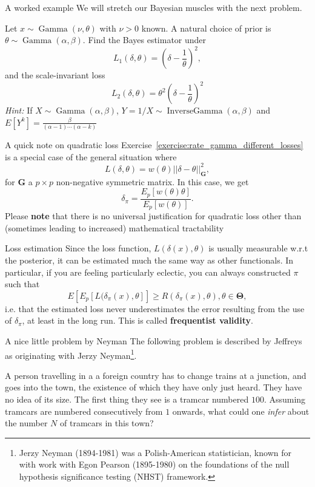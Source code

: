 \begin{frame}{A worked example}
We will stretch our Bayesian muscles with the next problem. 
\begin{exercise}
\label{exercise:rate_gamma_different_losses}
 Let $x \sim \operatorname{Gamma}(\nu, \theta)$ with $\nu >0$ known.
 A natural choice of prior is $\theta \sim \operatorname{Gamma}(\alpha, \beta)$.
 Find the Bayes estimator under 
 $$ L_1(\delta, \theta) = \left(\delta - \frac{1}{\theta}\right)^2, $$
 and the scale-invariant loss
 $$ L_2(\delta, \theta) = \theta^2 \left(\delta - \frac{1}{\theta}\right)^2$$
 \textit{Hint:} If $X \sim \operatorname{Gamma}(\alpha, \beta)$, $Y = 1/X \sim \operatorname{InverseGamma}(\alpha, \beta)$ and $E[Y^k] = \frac{\beta}{(\alpha-1)\cdots(\alpha-k)}$
\end{exercise}
\end{frame}
\begin{frame}{A quick note on quadratic loss}
 Exercise~\ref{exercise:rate_gamma_different_losses} is a special case of the general situation where 
 $$ L(\delta, \theta) = w(\theta) ||\delta-\theta||_{\boldsymbol{G}}^2, $$
 for $\boldsymbol{G}$ a $p \times p$ non-negative symmetric matrix.
 In this case, we get
 $$ \delta_\pi = \frac{E_p[w(\theta)\theta]}{E_p[w(\theta)]}. $$
 Please \textbf{note} that there is no universal justification for quadratic loss other than (sometimes leading to increased) mathematical tractability
\end{frame}
\begin{frame}{Loss estimation}
 Since the loss function, $L(\delta(x), \theta)$ is usually measurable w.r.t the posterior, it can be estimated much the same way as other functionals.
 In particular, if you are feeling particularly eclectic, you can always constructed $\pi$ such that
 $$ E\left[E_p[L(\delta_\pi(x), \theta]\right] \geq R(\delta_\pi(x), \theta),  \theta \in \boldsymbol{\Theta}, $$
 i.e. that the estimated loss never underestimates the error resulting from the use of $\delta_\pi$, at least in the long run.
 This is called \textbf{frequentist validity}.
 \end{frame}
\begin{frame}{A nice little problem by Neyman}
The following problem is described by Jeffreys as originating with Jerzy Neyman\footnote{Jerzy Neyman (1894-1981) was a Polish-American statistician, known for with work with Egon Pearson (1895-1980) on the foundations of the null hypothesis significance testing (NHST) framework.}.
\begin{exercise}
 \label{exercise:tramcar}
 A person travelling in a a foreign country has to change trains at a junction, and goes into the town, the existence of which they have only just heard.
 They have no idea of its size.
 The first thing they see is a tramcar numbered $100$.
 Assuming tramcars are numbered consecutively from $1$ onwards, what could one \textit{infer} about the number $N$ of tramcars in this town?
\end{exercise}

\end{frame}

